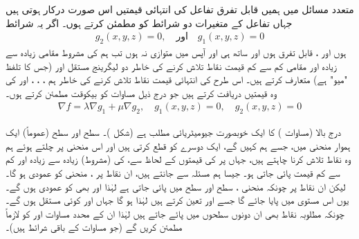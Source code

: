 متعدد مسائل میں ہمیں قابل تفرق تفاعل   کی انتہائی قیمتیں  اس صورت درکار ہوتی ہیں جہاں تفاعل کے متغیرات دو شرائط کو مطمئن کرتے ہوں۔ اگر یہ شرائط
\begin{align*}
g_2(x,y,z)=0,\quad \text{اور}\quad g_1(x,y,z)=0
\end{align*}
ہوں اور ،  قابل تفرق ہوں اور ساتھ ہی  اور   آپس میں متوازی نہ ہوں تب ہم  کی  مشروط مقامی زیادہ سے زیادہ اور مقامی کم سے کم قیمت نقاط تلاش کرنے کی خاطر دو لیگرینج مستقل  اور  (جس کا تلفظ  "میو" ہے)  متعارف کرتے ہیں۔ اس طرح  کی انتہائی قیمت نقاط تلاش کرنے کی خاطر ہم  ، ، ،  اور  کی وہ قیمتیں دریافت کرتے ہیں جو درج ذیل مساوات کو بیکوقت مطمئن کرتے ہوں۔
\begin{align}\label{مساوات_کثیرالمتغیر_دو_مستقل_لیگرینج_الف}
\nabla f=\lambda\nabla g_1+\mu\nabla g_2,\quad g_1(x,y,z)=0,\quad g_2(x,y,z)=0
\end{align}

درج بالا (مساوات ) کا  ایک خوبصورت جیومیٹریائی مطلب ہے (شکل )۔  سطح  اور سطح  (عموماً)  ایک ہموار منحنی  میں، جسے ہم  کہیں گے،  ایک دوسرے کو قطع کرتی ہیں اور اس منحنی پر چلتے ہوئے ہم وہ نقاط تلاش کرنا چاہتے ہیں، جہاں  پر  کی قیمتوں کے لحاظ سے،     کی (مشروط)  زیادہ سے زیادہ اور کم سے کم قیمت  پائی جاتی ہو۔ جیسا ہم مسئلہ  سے جانتے ہیں، ان نقاط پر ،  منحنی  کو عمودی ہو گا۔ لیکن ان نقاط پر چونکہ  منحنی ، سطح   اور  سطح  میں پائی جاتی ہے لہٰذا      اور  بھی  کو عمودی ہوں گے۔ یوں  اس مستوی میں پایا جائے گا جسے  اور  تعین کرتے ہیں لہٰذا  ہو گا جہاں  اور  کوئی مستقل ہوں گے۔ چونکہ  مطلوبہ نقاط بھی ان دونوں سطحوں میں پائے جاتے ہیں لہٰذا  ان کے محدد مساوات  اور  کو لازماً مطمئن کریں گے  (جو مساوات  کے باقی شرائط ہیں)۔


